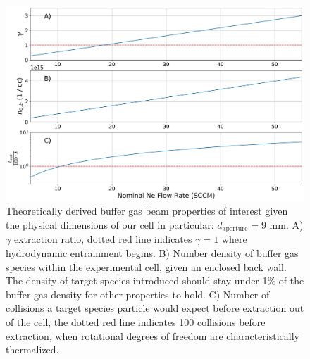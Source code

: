 \begin{figure}[H]
	\centering
	\includegraphics[width=1\textwidth]{images/CBGB_flow_characteristics.png}
	\caption{Theoretically derived buffer gas beam properties of interest given the physical dimensions of our cell in particular: $d_{\mathrm{aperture}} = 9$ mm. A) $\gamma$ extraction ratio, dotted red line indicates $\gamma = 1$ where hydrodynamic entrainment begins. B) Number density of buffer gas species within the experimental cell, given an enclosed back wall. The density of target species introduced should stay under 1\% of the buffer gas density for other properties to hold. C) Number of collisions a target species particle would expect before extraction out of the cell, the dotted red line indicates 100 collisions before extraction, when rotational degrees of freedom are characteristically thermalized.}
	\label{fig: buffer_gas_flow}
\end{figure}